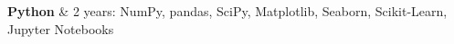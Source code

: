 \textbf{Python} & 
2 years:
NumPy, 
pandas, 
SciPy, 
Matplotlib, 
Seaborn, 
Scikit-Learn, 
Jupyter Notebooks